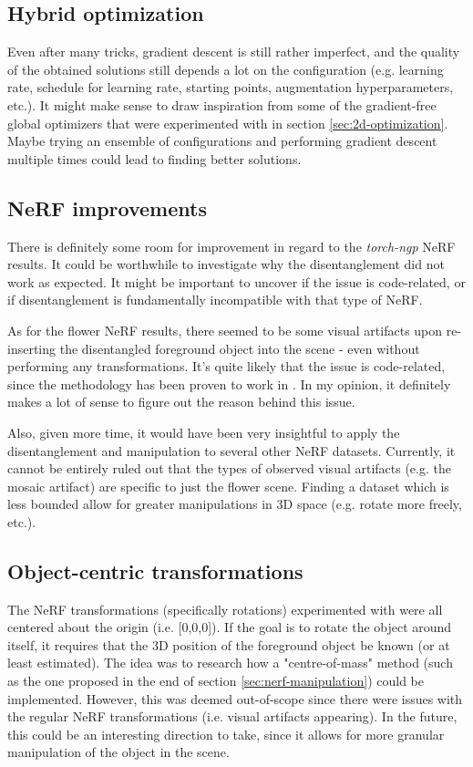 \subsection{Hybrid optimization}
Even after many tricks, gradient descent is still rather imperfect, and the quality of the obtained solutions still depends a lot on the configuration (e.g. learning rate, schedule for learning rate, starting points, augmentation hyperparameters, etc.). It might make sense to draw inspiration from some of the gradient-free global optimizers that were experimented with in section \ref{sec:2d-optimization}. Maybe trying an ensemble of configurations and performing gradient descent multiple times could lead to finding better solutions.


\subsection{NeRF improvements}
There is definitely some room for improvement in regard to the \textit{torch-ngp} NeRF results. It could be worthwhile to investigate why the disentanglement did not work as expected. It might be important to uncover if the issue is code-related, or if disentanglement is fundamentally incompatible with that type of NeRF.

As for the flower NeRF results, there seemed to be some visual artifacts upon re-inserting the disentangled foreground object into the scene - even without performing any transformations. It's quite likely that the issue is code-related, since the methodology has been proven to work in \cite{benaim2022}. In my opinion, it definitely makes a lot of sense to figure out the reason behind this issue.

Also, given more time, it would have been very insightful to apply the disentanglement and manipulation to several other NeRF datasets. Currently, it cannot be entirely ruled out that the types of observed visual artifacts (e.g. the mosaic artifact) are specific to just the flower scene. Finding a dataset which is less bounded allow for greater manipulations in 3D space (e.g. rotate more freely, etc.).

\subsection{Object-centric transformations}
The NeRF transformations (specifically rotations) experimented with were all centered about the origin (i.e. [0,0,0]). If the goal is to rotate the object around itself, it requires that the 3D position of the foreground object be known (or at least estimated).
The idea was to research how a "centre-of-mass" method (such as the one proposed in the end of section \ref{sec:nerf-manipulation}) could be implemented. However, this was deemed out-of-scope since there were  issues with the regular NeRF transformations (i.e. visual artifacts appearing). In the future, this could be an interesting direction to take, since it allows for more granular manipulation of the object in the scene.

